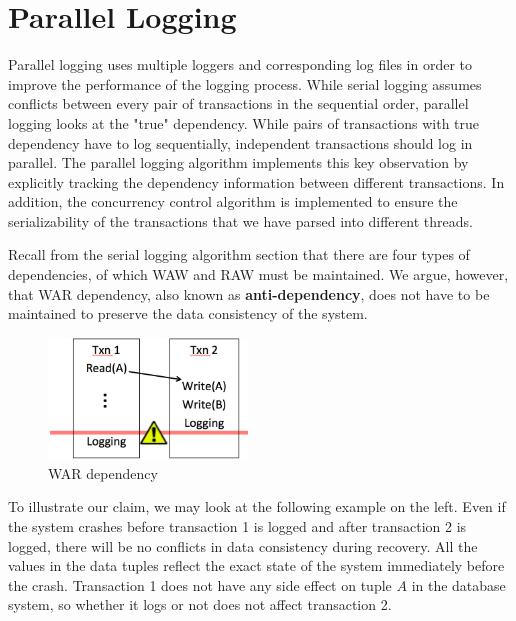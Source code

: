 \section{Parallel Logging}
Parallel logging uses multiple loggers and corresponding log files in order to improve the performance of the logging process. While serial logging assumes conflicts between every pair of transactions in the sequential order, parallel logging looks at the "true" dependency. While pairs of transactions with true dependency have to log sequentially, independent transactions should log in parallel. The parallel logging algorithm implements this key observation by explicitly tracking the dependency information between different transactions. In addition, the concurrency control algorithm is implemented to ensure the serializability of the transactions that we have parsed into different threads. \par


Recall from the serial logging algorithm section that there are four types of dependencies, of which WAW and RAW must be maintained. We argue, however, that WAR dependency, also known as  \textbf{anti-dependency}, does not have to be maintained to preserve the data consistency of the system.
\begin{figure}
  \begin{center}
    \includegraphics[width=150pt]{WAR.jpg}
  \end{center}
  \caption{WAR dependency}
\end{figure} 
To illustrate our claim, we may look at the following example on the left. Even if the system crashes before transaction 1 is logged and after transaction 2 is logged, there will be no conflicts in data consistency during recovery. All the values in the data tuples reflect the exact state of the system immediately before the crash. Transaction 1 does not have any side effect on tuple $A$ in the database system, so whether it logs or not does not affect transaction 2.\par


